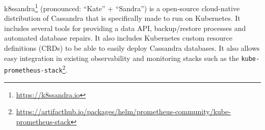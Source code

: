 k8ssandra\footnote{\url{https://k8ssandra.io}} (pronounced: ``Kate'' +  ``Sandra'') is a open-source cloud-native distribution of Cassandra that is specifically made to run on Kubernetes. It includes several tools for providing a data API, backup/restore processes and automated database repairs. It also includes Kubernetes custom resource definitions (CRDs) to be able to easily deploy Cassandra databases. It also allows easy integration in existing observability and monitoring stacks such as the \texttt{kube-prometheus-stack}\footnote{\raggedright\url{https://artifacthub.io/packages/helm/prometheus-community/kube-prometheus-stack}}.

